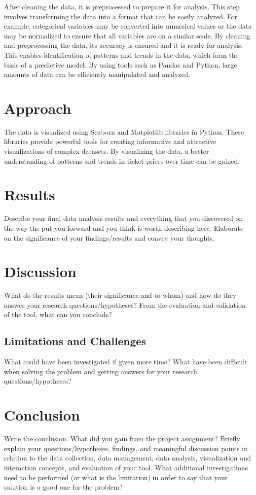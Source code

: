 After cleaning the data, it is preprocessed to prepare it for analysis. This step involves transforming the data into a format that can be easily analyzed.
For example, categorical variables may be converted into numerical values or the data may be normalized to ensure that all variables are on a similar scale.
By cleaning and preprocessing the data, its accuracy is ensured and it is ready for analysis.
This enables identification of patterns and trends in the data, which form the basis of a predictive model.
By using tools such as Pandas and Python, large amounts of data can be efficiently manipulated and analyzed.

\section{Approach}
\label{chap:approach}
The data is visualized using Seaborn and Matplotlib libraries in Python.
These libraries provide powerful tools for creating informative and attractive visualizations of complex datasets.
By visualizing the data, a better understanding of patterns and trends in ticket prices over time can be gained.


\section{Results}
\label{chap:results}
Describe your final data analysis results and everything that you discovered on the way the put you forward and you think is worth describing here.
Elaborate on the significance of your findings/results and convey your thoughts. 

\section{Discussion}
\label{chap:discussion}
What do the results mean (their significance and to whom) and how do they answer your research questions/hypotheses? 
From the evaluation and validation of the tool, what can you conclude? 

\subsection{Limitations and Challenges}
\label{sec:limitation}
What could have been investigated if given more time? What have been difficult when solving the problem and getting answers for your research questions/hypotheses?

\section{Conclusion}
\label{chap:conclusion}
Write the conclusion. What did you gain from the project assignment? Briefly explain your questions/hypotheses, findings, and meaningful discussion points in relation to the data collection, data management, data analysis, visualization and interaction concepts, and evaluation of your tool.
What additional investigations need to be performed (or what is the limitation) in order to say that your solution is a good one for the problem? 

